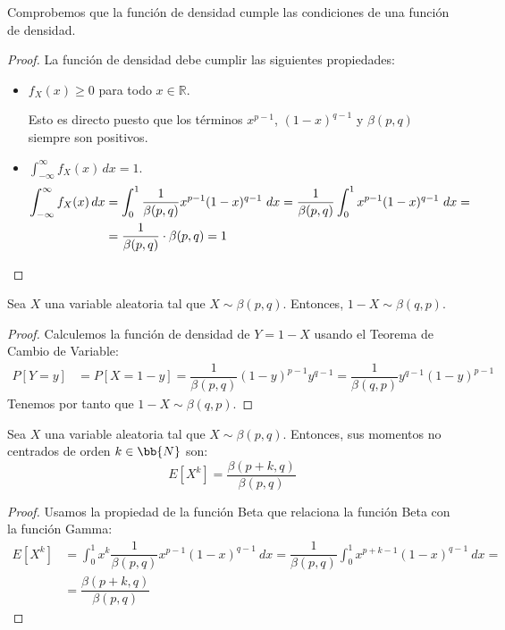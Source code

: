 Comprobemos que la función de densidad cumple las condiciones de una función de densidad.
\begin{proof}
    La función de densidad debe cumplir las siguientes propiedades:
    \begin{itemize}
        \item $f_X(x)\geq 0$ para todo $x\in \mathbb{R}$.
        
        Esto es directo puesto que los términos $x^{p-1}$, $(1-x)^{q-1}$ y $\beta(p,q)$ siempre son positivos.
        
        \item $\displaystyle \int_{-\infty}^{\infty} f_X(x) \, dx = 1$.
        \begin{align*}
            \int_{-\infty}^{\infty} f_X(x) \, dx &= \int_{0}^{1} \dfrac{1}{\beta(p,q)}x^{p-1}(1-x)^{q-1}~dx
            = \dfrac{1}{\beta(p,q)} \int_{0}^{1} x^{p-1}(1-x)^{q-1}~dx
            =\\& = \dfrac{1}{\beta(p,q)}\cdot \beta(p,q) = 1
            \qedhere
        \end{align*}
    \end{itemize}
\end{proof}

\begin{prop}[Simetría]
    Sea $X$ una variable aleatoria tal que $X\sim \beta(p,q)$. Entonces, $1-X\sim \beta(q,p)$.
\end{prop}
\begin{proof}
    Calculemos la función de densidad de $Y=1-X$ usando el Teorema de Cambio de Variable:
    \begin{align*}
        P[Y=y] &= P[X=1-y] = \dfrac{1}{\beta(p,q)}(1-y)^{p-1}y^{q-1}
        = \dfrac{1}{\beta(q,p)}y^{q-1}(1-y)^{p-1}
    \end{align*}
    Tenemos por tanto que $1-X\sim \beta(q,p)$.
\end{proof}


\begin{prop}
    Sea $X$ una variable aleatoria tal que $X\sim \beta(p,q)$. Entonces, sus momentos no centrados de orden $k\in \bb{N}$ son:
    \begin{equation*}
        E[X^k] = \dfrac{\beta(p+k,q)}{\beta(p,q)}
    \end{equation*}
\end{prop}
\begin{proof}
    Usamos la propiedad de la función Beta que relaciona la función Beta con la función Gamma:
    \begin{align*}
        E[X^k] &= \int_{0}^{1} x^k \dfrac{1}{\beta(p,q)}x^{p-1}(1-x)^{q-1}~dx
        = \dfrac{1}{\beta(p,q)} \int_{0}^{1} x^{p+k-1}(1-x)^{q-1}~dx
        =\\&= \dfrac{\beta(p+k,q)}{\beta(p,q)}
    \end{align*}
\end{proof}

